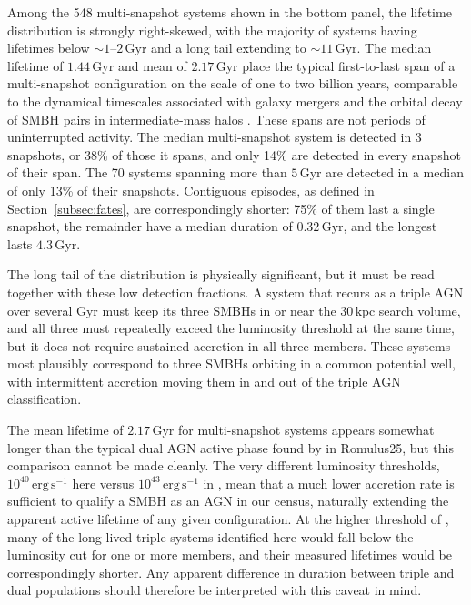 \documentclass[twocolumn, 10pt]{article}
\begin{document}
Among the 548 multi-snapshot systems shown in the bottom panel, the lifetime distribution is strongly right-skewed, with the majority of systems having lifetimes below $\sim 1$--$2\,\mathrm{Gyr}$ and a long tail extending to $\sim 11\,\mathrm{Gyr}$. The median lifetime of $1.44\,\mathrm{Gyr}$ and mean of $2.17\,\mathrm{Gyr}$ place the typical first-to-last span of a multi-snapshot configuration on the scale of one to two billion years, comparable to the dynamical timescales associated with galaxy mergers and the orbital decay of SMBH pairs in intermediate-mass halos \citep[e.g.][]{Tremmel2018}. These spans are not periods of uninterrupted activity. The median multi-snapshot system is detected in 3 snapshots, or 38\% of those it spans, and only 14\% are detected in every snapshot of their span. The 70 systems spanning more than $5\,\mathrm{Gyr}$ are detected in a median of only 13\% of their snapshots. Contiguous episodes, as defined in Section~\ref{subsec:fates}, are correspondingly shorter: 75\% of them last a single snapshot, the remainder have a median duration of $0.32\,\mathrm{Gyr}$, and the longest lasts $4.3\,\mathrm{Gyr}$.
 
The long tail of the distribution is physically significant, but it must be read together with these low detection fractions. A system that recurs as a triple AGN over several Gyr must keep its three SMBHs in or near the $30\,\mathrm{kpc}$ search volume, and all three must repeatedly exceed the luminosity threshold at the same time, but it does not require sustained accretion in all three members. These systems most plausibly correspond to three SMBHs orbiting in a common potential well, with intermittent accretion moving them in and out of the triple AGN classification.
 
The mean lifetime of $2.17\,\mathrm{Gyr}$ for multi-snapshot systems appears somewhat longer than the typical dual AGN active phase found by \citet{Saeedzadeh2024} in Romulus25, but this comparison cannot be made cleanly. The very different luminosity thresholds, $10^{40}\,\mathrm{erg\,s^{-1}}$ here versus $10^{43}\,\mathrm{erg\,s^{-1}}$ in \citeauthor{Saeedzadeh2024}, mean that a much lower accretion rate is sufficient to qualify a SMBH as an AGN in our census, naturally extending the apparent active lifetime of any given configuration. At the higher threshold of \citet{Saeedzadeh2024}, many of the long-lived triple systems identified here would fall below the luminosity cut for one or more members, and their measured lifetimes would be correspondingly shorter. Any apparent difference in duration between triple and dual populations should therefore be interpreted with this caveat in mind.
 
\end{document}
